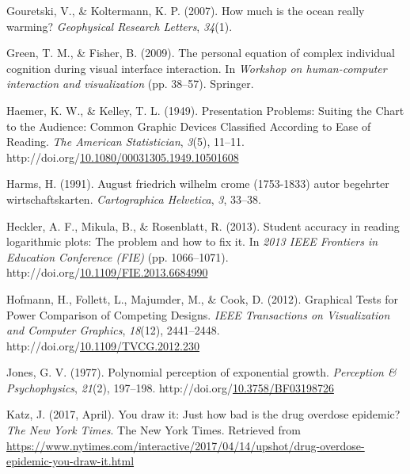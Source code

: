 \documentclass[print]{nuthesis}
\newlength{\cslhangindent}
\newenvironment{CSLReferences}%
{\setlength{\parindent}{0pt}%
\everypar{\setlength{\hangindent}{\cslhangindent}}\ignorespaces}%
{\par}
\begin{document}
\begin{CSLReferences}{1}{0}
\leavevmode\hypertarget{ref-gouretski2007much}{}%
Gouretski, V., \& Koltermann, K. P. (2007). How much is the ocean really warming? \emph{Geophysical Research Letters}, \emph{34}(1).

\leavevmode\hypertarget{ref-green2009personal}{}%
Green, T. M., \& Fisher, B. (2009). The personal equation of complex individual cognition during visual interface interaction. In \emph{Workshop on human-computer interaction and visualization} (pp. 38--57). Springer.

\leavevmode\hypertarget{ref-haemer_presentation_1949}{}%
Haemer, K. W., \& Kelley, T. L. (1949). Presentation {Problems}: {Suiting} the {Chart} to the {Audience}: {Common} {Graphic} {Devices} {Classified} {According} to {Ease} of {Reading}. \emph{The American Statistician}, \emph{3}(5), 11--11. http://doi.org/\href{https://doi.org/10.1080/00031305.1949.10501608}{10.1080/00031305.1949.10501608}

\leavevmode\hypertarget{ref-harms1991august}{}%
Harms, H. (1991). August friedrich wilhelm crome (1753-1833) autor begehrter wirtschaftskarten. \emph{Cartographica Helvetica}, \emph{3}, 33--38.

\leavevmode\hypertarget{ref-heckler_student_2013}{}%
Heckler, A. F., Mikula, B., \& Rosenblatt, R. (2013). Student accuracy in reading logarithmic plots: {The} problem and how to fix it. In \emph{2013 {IEEE} {Frontiers} in {Education} {Conference} ({FIE})} (pp. 1066--1071). http://doi.org/\href{https://doi.org/10.1109/FIE.2013.6684990}{10.1109/FIE.2013.6684990}

\leavevmode\hypertarget{ref-hofmann_graphical_2012}{}%
Hofmann, H., Follett, L., Majumder, M., \& Cook, D. (2012). Graphical {Tests} for {Power} {Comparison} of {Competing} {Designs}. \emph{IEEE Transactions on Visualization and Computer Graphics}, \emph{18}(12), 2441--2448. http://doi.org/\href{https://doi.org/10.1109/TVCG.2012.230}{10.1109/TVCG.2012.230}

\leavevmode\hypertarget{ref-jones_polynomial_1977}{}%
Jones, G. V. (1977). Polynomial perception of exponential growth. \emph{Perception \& Psychophysics}, \emph{21}(2), 197--198. http://doi.org/\href{https://doi.org/10.3758/BF03198726}{10.3758/BF03198726}

\leavevmode\hypertarget{ref-katz_2017}{}%
Katz, J. (2017, April). You draw it: Just how bad is the drug overdose epidemic? \emph{The New York Times}. The New York Times. Retrieved from \url{https://www.nytimes.com/interactive/2017/04/14/upshot/drug-overdose-epidemic-you-draw-it.html}


\end{CSLReferences}
\end{document}
